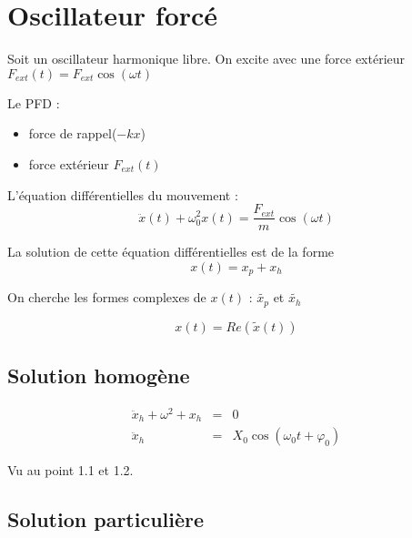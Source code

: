 \section{Oscillateur forcé}

Soit un oscillateur harmonique libre. On excite avec une force extérieur $F_{ext}(t) = F_{ext}\cos(\omega t)$

Le PFD :
\begin{itemize}
	\item force de rappel($-kx$)
	\item force extérieur $F_{ext}(t)$
\end{itemize}

L'équation différentielles du mouvement : \[\ddot{x}(t)+\omega_0^2 x(t) = \frac{F_{ext}}{m}\cos(\omega t)\]

La solution de cette équation différentielles est de la forme \[x(t) = x_p + x_h\]

On cherche les formes complexes de $x(t)$ : $\tilde{x_p}$ et $\tilde{x_h}$

\[x(t) = Re(\tilde{x}(t))\]

\subsection{Solution homogène}
\[\begin{array}{rcl}
		\ddot{x}_h + \omega^2 + x_h &=& 0 \\
		\ddot{x}_h &=& X_0\cos(\omega_0 t + \varphi_0) 
	\end{array}
\]

Vu au point 1.1 et 1.2.

\subsection{Solution particulière}

